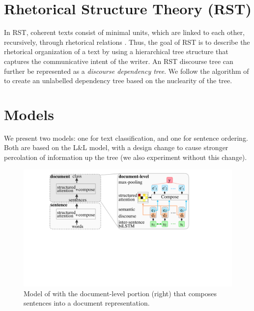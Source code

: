 \section{Rhetorical Structure Theory (RST)}
In RST, coherent texts consist of minimal units, which are linked to each other, recursively, through rhetorical relations \cite{Mann:1988}. Thus, the goal of RST is to describe the rhetorical organization of a text by using a hierarchical tree structure that captures the communicative intent of the writer. An RST discourse tree can further be represented as a \emph{discourse dependency tree}. We follow the algorithm of \citet{Hirao:2013} to create an unlabelled dependency tree based on the nuclearity of the tree.


\section{Models}
\label{sec:models}
We present two models: one for text classification, and one for sentence ordering. Both are based on the L\&L model, with a design change to cause stronger percolation of information up the tree (we also experiment without this change). 

\begin{figure}[t]
\centering
\includegraphics[scale=0.15]{plots/latent_liu_lapata_var_schematic.pdf}
\vspace{-0.2em}
\caption{Model of \citet{Liu:2018} with the document-level portion (right) that composes sentences into a document representation.}
\label{fig:model}
\vspace{-0.9em}
\end{figure}


